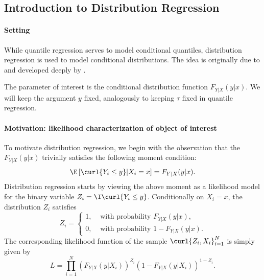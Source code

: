  
 \subsection{Introduction to Distribution Regression}
 \label{quantile:subsection:distribution_regression}
 
 \paragraph{Setting}
 
 While quantile regression serves to model conditional quantiles, distribution regression is used to model conditional distributions. The idea is originally due to  \cite{Foresi1995ConditionalDistributionExcess} and developed deeply by \cite{Chernozhukov2013b}.
 
 The parameter of interest is the conditional distribution function $F_{Y|X}(y|x)$. We will keep the argument $y$ fixed, analogously to keeping $\tau$ fixed in quantile regression. 
 
 \paragraph{Motivation: likelihood characterization of object of interest}
 
 To motivate distribution regression, we begin with the observation that the $F_{Y|X}(y|x)$ trivially satisfies the following moment condition:
 \begin{equation}
 	 \E\left[ \curl{Y_i\leq y}|X_i =x \right]=  F_{Y|X}(y|x).
 \end{equation}
 Distribution regression starts by viewing the above moment as a likelihood model for the binary variable $Z_i= \I\curl{Y_i\leq y}$. Conditionally on $X_i=x$, the distribution $Z_i$ satisfies
 \begin{equation}
 	 Z_i = \begin{cases}
 	   1, & \text{ with probability } F_{Y|X}(y|x),\\
 	   0, & \text{ with probability } 1- F_{Y|X}(y|x).
 	 \end{cases} 
 \end{equation}
 The corresponding likelihood function of the sample  $\curl{Z_i, X_i}_{i=1}^N$  is simply given by
 \begin{equation}\label{quantile:equation:dr_nonparametric_likelihood}
 	 L =  \prod_{i=1}^N \left(F_{Y|X}(y|X_i) \right)^{Z_i} \left(  1-F_{Y|X}(y|X_i)  \right)^{1-Z_i}.
 \end{equation}
 
